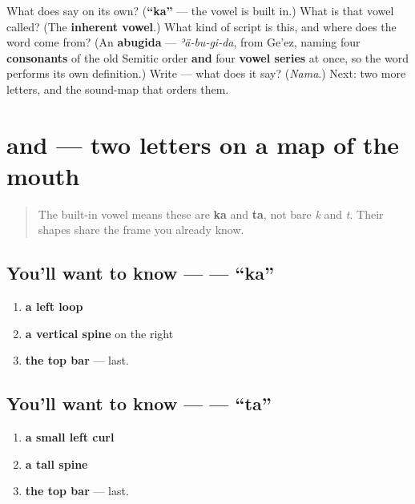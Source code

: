 \begin{tcolorbox}[breakable,colback=teal!4,colframe=teal!35!black,title={Before you move on}]
What does  say on its own? (\textbf{\textquotedblleft{}ka\textquotedblright{}} — the vowel is built in.) What is that vowel called? (The \textbf{inherent vowel}.) What kind of script is this, and where does the word come from? (An \textbf{abugida} — \emph{ʾä-bu-gi-da}, from Ge'ez, naming four \textbf{consonants} of the old Semitic order \textbf{and} four \textbf{vowel series} at once, so the word performs its own definition.) Write \textbf{} — what does it say? (\emph{Nama}.) Next: two more letters, and the sound-map that orders them.
\end{tcolorbox}
\section[\texorpdfstring{\hi{क}, \hi{त} (ka, ta)}{क, त (ka, ta)}]{ and  — two letters on a map of the mouth}

\label{lesson:HI-W02-ka-ta-mouth-order}



\begin{quote}
The built-in vowel means these are \textbf{ka} and \textbf{ta}, not bare \emph{k} and \emph{t}. Their shapes share the frame you already know.
\end{quote}

\subsection*{You'll want to know —  — \textquotedblleft{}ka\textquotedblright{}}
\begin{enumerate}
\raggedright
  \item \textbf{a left loop}
  \item \textbf{a vertical spine} on the right
  \item \textbf{the top bar} — last.
\end{enumerate}

\subsection*{You'll want to know —  — \textquotedblleft{}ta\textquotedblright{}}
\begin{enumerate}
\raggedright
  \item \textbf{a small left curl}
  \item \textbf{a tall spine}
  \item \textbf{the top bar} — last.
\end{enumerate}

